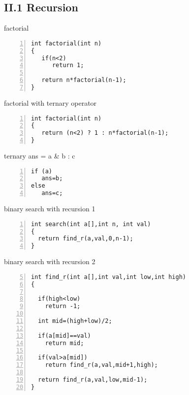 \documentclass{beamer}
\begin{document}
\subsection*{II.1 Recursion}
\begin{frame}[fragile]{factorial}
\begin{lstlisting}[numbers=left]
int factorial(int n)
{
   if(n<2)
      return 1;

   return n*factorial(n-1);
}
\end{lstlisting}
\end{frame}


\begin{frame}[fragile]{factorial with ternary operator}
\begin{lstlisting}[numbers=left]
int factorial(int n)
{
   return (n<2) ? 1 : n*factorial(n-1);
}
\end{lstlisting}
\end{frame}


\begin{frame}[fragile]{ternary ans = a \& b : c }
\begin{lstlisting}[numbers=left]
if (a)
   ans=b;
else 
   ans=c;
\end{lstlisting}
\end{frame}




\begin{frame}[fragile]{binary search with recursion 1}
\begin{lstlisting}[numbers=left]
int search(int a[],int n, int val)
{
  return find_r(a,val,0,n-1);
}
\end{lstlisting}
\end{frame}

\begin{frame} [fragile]{binary search with recursion 2}
\begin{lstlisting}[numbers=left,firstnumber=5]
int find_r(int a[],int val,int low,int high)
{

  if(high<low)
    return -1;

  int mid=(high+low)/2;

  if(a[mid]==val)
    return mid;

  if(val>a[mid])
    return find_r(a,val,mid+1,high);
  
  return find_r(a,val,low,mid-1);
}
\end{lstlisting}
\end{frame}
\end{document}
